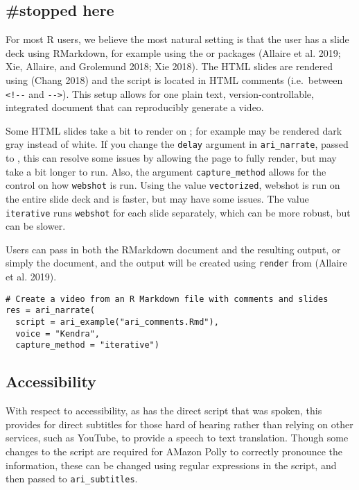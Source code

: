 \hypertarget{stopped-here}{%
\subsection{\#stopped here}\label{stopped-here}}

For most R users, we believe the most natural setting is that the user
has a slide deck using RMarkdown, for example using the
 or  packages (Allaire et al. 2019;
Xie, Allaire, and Grolemund 2018; Xie 2018). The HTML slides are
rendered using  (Chang 2018) and the script is located
in HTML comments (i.e.~between \texttt{\textless{}!-\/-} and
\texttt{-\/-\textgreater{}}). This setup allows for one plain text,
version-controllable, integrated document that can reproducibly generate
a video.

Some HTML slides take a bit to render on ; for example may
be rendered dark gray instead of white. If you change the \texttt{delay}
argument in \texttt{ari\_narrate}, passed to , this can
resolve some issues by allowing the page to fully render, but may take a
bit longer to run. Also, the argument \texttt{capture\_method} allows
for the control on how \texttt{webshot} is run. Using the value
\texttt{vectorized}, webshot is run on the entire slide deck and is
faster, but may have some issues. The value \texttt{iterative} runs
\texttt{webshot} for each slide separately, which can be more robust,
but can be slower.

Users can pass in both the RMarkdown document and the resulting output,
or simply the document, and the output will be created using
\texttt{render} from  (Allaire et al. 2019).

\begin{verbatim}
# Create a video from an R Markdown file with comments and slides
res = ari_narrate(
  script = ari_example("ari_comments.Rmd"),
  voice = "Kendra",
  capture_method = "iterative")
\end{verbatim}

\hypertarget{accessibility}{%
\subsection{Accessibility}\label{accessibility}}

With respect to accessibility, as  has the direct script that
was spoken, this provides for direct subtitles for those hard of hearing
rather than relying on other services, such as YouTube, to provide a
speech to text translation. Though some changes to the script are
required for AMazon Polly to correctly pronounce the information, these
can be changed using regular expressions in the script, and then passed
to \texttt{ari\_subtitles}.

